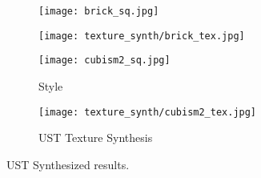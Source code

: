 \begin{figure}[H]
	\centering
	\begin{subfigure}[b]{0.4\linewidth}
		\texttt{[image: brick\_sq.jpg]} %
	\end{subfigure}
	\begin{subfigure}[b]{0.4\linewidth}
		\texttt{[image: texture\_synth/brick\_tex.jpg]} %
	\end{subfigure}
	\centering
	\begin{subfigure}[b]{0.4\linewidth}
		\texttt{[image: cubism2\_sq.jpg]} %
		\caption{Style}
	\end{subfigure}
	\begin{subfigure}[b]{0.4\linewidth}
		\texttt{[image: texture\_synth/cubism2\_tex.jpg]} %
		\caption{UST Texture Synthesis}
	\end{subfigure}
	\caption{UST Synthesized results.}
	\label{fig:texture}
\end{figure}